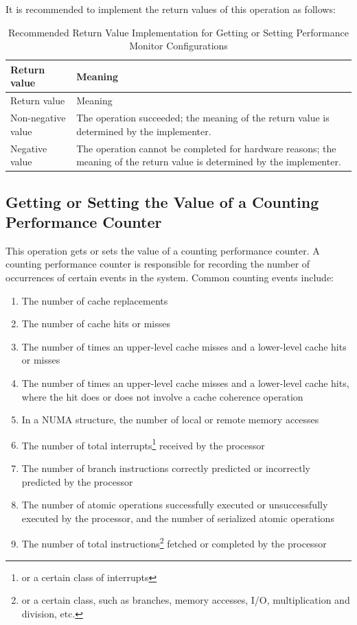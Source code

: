 It is recommended to implement the return values of this operation as follows:

\begin{xltabular}{\textwidth}{@{}>{\hsize\raggedright\arraybackslash}X>{\hsize\raggedright\arraybackslash}X@{}}
\caption{Recommended Return Value Implementation for Getting or Setting Performance Monitor Configurations}\label{tab:8-61-get-or-set-performance-monitor-configuration-suggested-return-values}\\
\toprule
Return value & Meaning\tabularnewline
\endfirsthead
\toprule
Return value & Meaning\tabularnewline
\midrule
\endhead
\bottomrule
\endlastfoot
    Non-negative value & The operation succeeded; the meaning of the return value is determined by the implementer.\tabularnewline
    Negative value & The operation cannot be completed for hardware reasons; the meaning of the return value is determined by the implementer.\tabularnewline
\end{xltabular}
\nopagebreak[4]

\subsection{Getting or Setting the Value of a Counting Performance Counter}\label{subsec:8-get-or-set-count-performance-counter}

This operation gets or sets the value of a counting performance counter. A counting performance counter is responsible for recording the number of occurrences of certain events in the system. Common counting events include:

\begin{enumerate}
\def\labelenumi{\arabic{enumi}.}
\item
  The number of cache replacements
\item
  The number of cache hits or misses
\item
  The number of times an upper-level cache misses and a lower-level cache hits or misses
\item
  The number of times an upper-level cache misses and a lower-level cache hits, where the hit does or does not involve a cache coherence operation
\item
  In a NUMA structure, the number of local or remote memory accesses
\item
  The number of total interrupts\footnote{or a certain class of interrupts} received by the processor
\item
  The number of branch instructions correctly predicted or incorrectly predicted by the processor
\item
  The number of atomic operations successfully executed or unsuccessfully executed by the processor, and the number of serialized atomic operations
\item
  The number of total instructions\footnote{or a certain class, such as branches, memory accesses, I/O, multiplication and division, etc.} fetched or completed by the processor
\end{enumerate}

